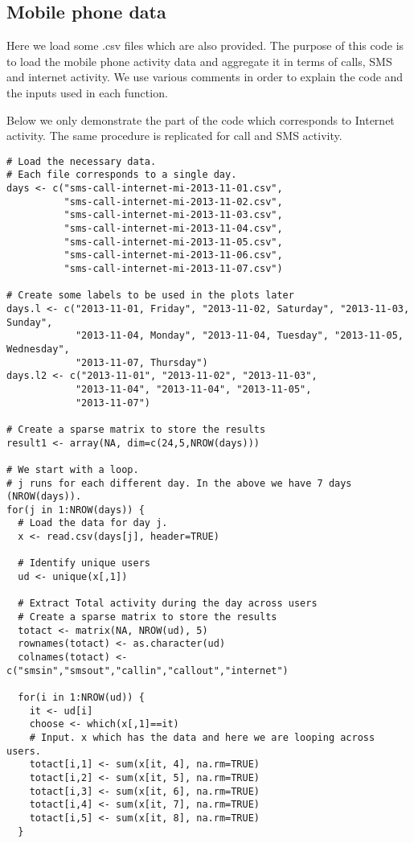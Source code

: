 \documentclass[12pt]{article}
\begin{document}
\subsection{Mobile phone data \textendash{} {\href{https://github.com/eurostat/econowcast/blob/master/extract/Mobile.R}{}}}

Here we load some .csv files which are also provided. The purpose of this
code is to load the mobile phone activity data and aggregate it in terms of
calls, SMS and internet activity. We use various comments in order to
explain the code and the inputs used in each function.

Below we only demonstrate the part of the code which corresponds to Internet
activity. The same procedure is replicated for call and SMS activity.

\begin{lstlisting}[title=\textbf{Mobile phone data aggregation and plots.}]
# Load the necessary data.
# Each file corresponds to a single day.
days <- c("sms-call-internet-mi-2013-11-01.csv",
          "sms-call-internet-mi-2013-11-02.csv",
          "sms-call-internet-mi-2013-11-03.csv",
          "sms-call-internet-mi-2013-11-04.csv",
          "sms-call-internet-mi-2013-11-05.csv",
          "sms-call-internet-mi-2013-11-06.csv",
          "sms-call-internet-mi-2013-11-07.csv")

# Create some labels to be used in the plots later		
days.l <- c("2013-11-01, Friday", "2013-11-02, Saturday", "2013-11-03, Sunday",
            "2013-11-04, Monday", "2013-11-04, Tuesday", "2013-11-05, Wednesday",
            "2013-11-07, Thursday")
days.l2 <- c("2013-11-01", "2013-11-02", "2013-11-03",
            "2013-11-04", "2013-11-04", "2013-11-05",
            "2013-11-07")

# Create a sparse matrix to store the results	
result1 <- array(NA, dim=c(24,5,NROW(days)))

# We start with a loop.
# j runs for each different day. In the above we have 7 days (NROW(days)).
for(j in 1:NROW(days)) {
  # Load the data for day j.
  x <- read.csv(days[j], header=TRUE)

  # Identify unique users
  ud <- unique(x[,1])

  # Extract Total activity during the day across users
  # Create a sparse matrix to store the results
  totact <- matrix(NA, NROW(ud), 5)
  rownames(totact) <- as.character(ud)
  colnames(totact) <- c("smsin","smsout","callin","callout","internet")

  for(i in 1:NROW(ud)) {
    it <- ud[i]
    choose <- which(x[,1]==it)
    # Input. x which has the data and here we are looping across users.
    totact[i,1] <- sum(x[it, 4], na.rm=TRUE)
    totact[i,2] <- sum(x[it, 5], na.rm=TRUE)
    totact[i,3] <- sum(x[it, 6], na.rm=TRUE)
    totact[i,4] <- sum(x[it, 7], na.rm=TRUE)
    totact[i,5] <- sum(x[it, 8], na.rm=TRUE)
  }
  

\end{lstlisting}
\end{document}
